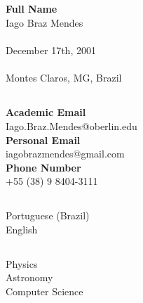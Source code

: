 \documentclass{cv}
\begin{document}
    \firstsection
        {
            \subsection*{}
                \textbf{Full Name} \\ Iago Braz Mendes \\
                \faCalendar \\ December 17th, 2001 \\
                \faHome \\ Montes Claros, MG, Brazil
        }
        {
            \subsection*{}
                \textbf{Academic Email} \\ {\footnotesize Iago.Braz.Mendes@oberlin.edu} \\
                \textbf{Personal Email} \\ {\footnotesize iagobrazmendes@gmail.com} \\
                \textbf{Phone Number} \\ +55 (38) 9 8404-3111
        }
        {
            \subsection*{}
                Portuguese (Brazil) \\ English
        }
        {
            \subsection*{}
                Physics \\ Astronomy \\ Computer Science
        }
\end{document}
